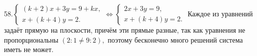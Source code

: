 58.$\begin{cases}
(k+2)x+3y=9+kx,\\
x+(k+4)y=2.
\end{cases}\Leftrightarrow\begin{cases}
2x+3y=9,\\
x+(k+4)y=2.
\end{cases}
$
Каждое из уравнений задаёт прямую на плоскости, причём эти прямые разные, так как уравнения не пропорциональны $(2:1\neq9:2),$ поэтому бесконечно много решений система иметь не может.\\
